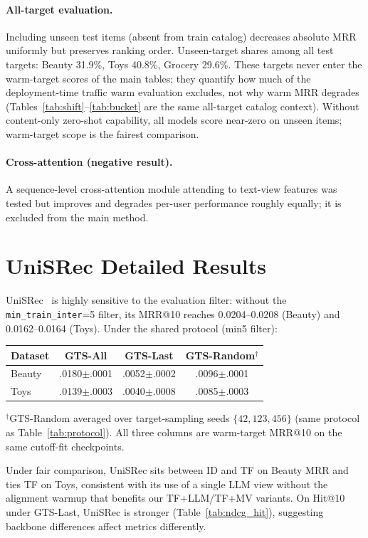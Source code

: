 \documentclass[sigconf,natbib=true,anonymous]{acmart}
\newcommand{\tfllm}{\textsc{TF+LLM}\xspace}
\newcommand{\tfmv}{\textsc{TF+MV}\xspace}
\begin{document}
\paragraph{All-target evaluation.}
Including unseen test items (absent from train catalog) decreases absolute MRR uniformly but preserves ranking order.
Unseen-target shares among all test targets: Beauty 31.9\%, Toys 40.8\%, Grocery 29.6\%.
These targets never enter the warm-target scores of the main tables; they quantify how much of the deployment-time traffic warm evaluation excludes, not why warm MRR degrades (Tables~\ref{tab:shift}--\ref{tab:bucket} are the same all-target catalog context).
Without content-only zero-shot capability, all models score near-zero on unseen items; warm-target scope is the fairest comparison.

\paragraph{Cross-attention (negative result).}
\label{app:cross}
A sequence-level cross-attention module attending to text-view features was tested but improves and degrades per-user performance roughly equally; it is excluded from the main method.

\section{UniSRec Detailed Results}
\label{app:unisrec}

UniSRec~\cite{hou2022unisrec} is highly sensitive to the evaluation filter: without the \texttt{min\_train\_inter}=5 filter, its MRR@10 reaches 0.0204--0.0208 (Beauty) and 0.0162--0.0164 (Toys).
Under the shared protocol (min5 filter):

\begin{table}[h]
\centering
\small
\begin{tabular}{@{}lccc@{}}
\toprule
Dataset & GTS-All & GTS-Last & GTS-Random$^\dagger$ \\
\midrule
Beauty & .0180$\pm$.0001 & .0052$\pm$.0002 & .0096$\pm$.0001 \\
Toys   & .0139$\pm$.0003 & .0040$\pm$.0008 & .0085$\pm$.0003 \\
\bottomrule
\end{tabular}
\end{table}

\noindent$^\dagger$GTS-Random averaged over target-sampling seeds $\{42,123,456\}$ (same protocol as Table~\ref{tab:protocol}).
All three columns are warm-target MRR@10 on the same cutoff-fit checkpoints.

Under fair comparison, UniSRec sits between ID and TF on Beauty MRR and ties TF on Toys, consistent with its use of a single LLM view without the alignment warmup that benefits our \tfllm/\tfmv variants.
On Hit@10 under GTS-Last, UniSRec is stronger (Table~\ref{tab:ndcg_hit}), suggesting backbone differences affect metrics differently.



\end{document}
